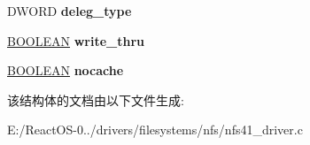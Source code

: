 \begin{DoxyCompactItemize}
\mbox{\label{struct___n_f_s41___f_o_b_x_a17c9c36405558b2a1b0df853726ebdaf}} 
D\+W\+O\+RD {\bfseries deleg\+\_\+type}
\item 
\mbox{\label{struct___n_f_s41___f_o_b_x_a81675102e8c40e82d6dec91338005aea}} 
\hyperlink{_processor_bind_8h_a112e3146cb38b6ee95e64d85842e380a}{B\+O\+O\+L\+E\+AN} {\bfseries write\+\_\+thru}
\item 
\mbox{\label{struct___n_f_s41___f_o_b_x_a3133a112721e92f38c732b2e6e0e5ba1}} 
\hyperlink{_processor_bind_8h_a112e3146cb38b6ee95e64d85842e380a}{B\+O\+O\+L\+E\+AN} {\bfseries nocache}
\end{DoxyCompactItemize}


该结构体的文档由以下文件生成\+:\begin{DoxyCompactItemize}
\item 
E\+:/\+React\+O\+S-\/0../drivers/filesystems/nfs/nfs41\+\_\+driver.\+c\end{DoxyCompactItemize}
